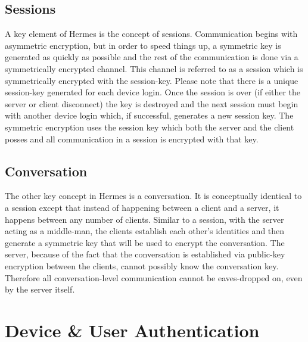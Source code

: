 \documentclass{article}
\begin{document}
\subsection{Sessions}

A key element of Hermes is the concept of sessions. Communication begins with asymmetric encryption, but in order to speed things up, a symmetric key is generated as quickly as possible and the rest of the communication is done via a symmetrically encrypted channel. This channel is referred to as a session which is symmetrically encrypted with the session-key. Please note that there is a unique session-key generated for each device login. Once the session is over (if either the server or client disconnect) the key is destroyed and the next session must begin with another device login which, if successful, generates a new session key. The symmetric encryption uses the session key which both the server and the client posses and all communication in a session is encrypted with that key.

\subsection{Conversation}

The other key concept in Hermes is a conversation. It is conceptually identical to a session except that instead of happening between a client and a server, it happens between any number of clients. Similar to a session, with the server acting as a middle-man, the clients establish each other's identities and then generate a symmetric key that will be used to encrypt the conversation. The server, because of the fact that the conversation is established via public-key encryption between the clients, cannot possibly know the conversation key. Therefore all conversation-level communication cannot be eaves-dropped on, even by the server itself.

\section{Device \& User Authentication}
\end{document}
